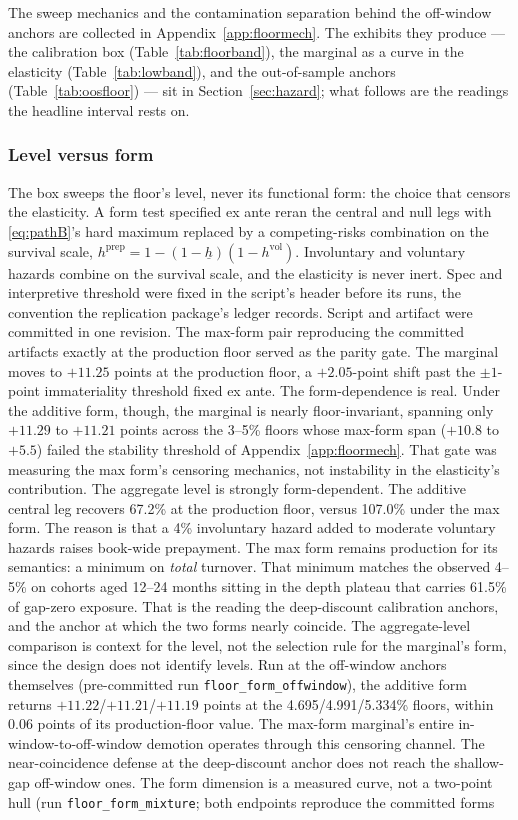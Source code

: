 \documentclass[12pt]{article}
\begin{document}
The sweep mechanics and the contamination separation behind the off-window anchors are collected in Appendix~\ref{app:floormech}. The exhibits they produce --- the calibration box (Table~\ref{tab:floorband}), the marginal as a curve in the elasticity (Table~\ref{tab:lowband}), and the out-of-sample anchors (Table~\ref{tab:oosfloor}) --- sit in Section~\ref{sec:hazard}; what follows are the readings the headline interval rests on.

\subsubsection{Level versus form}

The box sweeps the floor's level, never its functional form: the choice that censors the elasticity. A form test specified ex ante reran the central and null legs with \eqref{eq:pathB}'s hard maximum replaced by a competing-risks combination on the survival scale, $h^{\mathrm{prep}} = 1 - (1 - \underline{h})(1 - h^{\mathrm{vol}})$. Involuntary and voluntary hazards combine on the survival scale, and the elasticity is never inert. Spec and interpretive threshold were fixed in the script's header before its runs, the convention the replication package's ledger records. Script and artifact were committed in one revision. The max-form pair reproducing the committed artifacts exactly at the production floor served as the parity gate. The marginal moves to $+11.25$ points at the production floor, a $+2.05$-point shift past the $\pm 1$-point immateriality threshold fixed ex ante. The form-dependence is real. Under the additive form, though, the marginal is nearly floor-invariant, spanning only $+11.29$ to $+11.21$ points across the 3--5\% floors whose max-form span ($+10.8$ to $+5.5$) failed the stability threshold of Appendix~\ref{app:floormech}. That gate was measuring the max form's censoring mechanics, not instability in the elasticity's contribution. The aggregate level is strongly form-dependent. The additive central leg recovers 67.2\% at the production floor, versus 107.0\% under the max form. The reason is that a 4\% involuntary hazard added to moderate voluntary hazards raises book-wide prepayment. The max form remains production for its semantics: a minimum on \emph{total} turnover. That minimum matches the observed 4--5\% on cohorts aged 12--24 months sitting in the depth plateau that carries 61.5\% of gap-zero exposure. That is the reading the deep-discount calibration anchors, and the anchor at which the two forms nearly coincide. The aggregate-level comparison is context for the level, not the selection rule for the marginal's form, since the design does not identify levels. Run at the off-window anchors themselves (pre-committed run \texttt{floor\_form\_offwindow}), the additive form returns $+11.22$/$+11.21$/$+11.19$ points at the 4.695/4.991/5.334\% floors, within 0.06 points of its production-floor value. The max-form marginal's entire in-window-to-off-window demotion operates through this censoring channel. The near-coincidence defense at the deep-discount anchor does not reach the shallow-gap off-window ones. The form dimension is a measured curve, not a two-point hull (run \texttt{floor\_form\_mixture}; both endpoints reproduce the committed forms 
\end{document}

